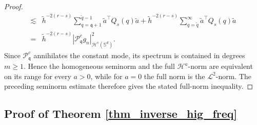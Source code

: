 \documentclass{article}
\numberwithin{equation}{section}
\def\SS{\mathbb{S}}
\def\sul{\sum\limits}
\def\rr{ r}
\def\ss{ s}
\def\pc{\mathcal{P}^c}
\def\mq{\mathfrak{q}}
\begin{document}
\begin{proof}
\begin{equation}
\begin{split}
        \lesssim&\tilde{h}^{-2(\rr-\ss)}\sul_{q=\mq+1}^{\tilde q-1}\tilde{a}^\top Q_\ss(q)\tilde{a}
        +\tilde{h}^{-2(\rr-\ss)}\sul_{q=\tilde q}^{\infty}\tilde{a}^\top Q_\ss(q)\tilde{a}\\
        =&\tilde{h}^{-2(\rr-\ss)}|\pc_\mq g_n|_{\mathcal{H}^s(\SS^d)}^2.
    \end{split}
\end{equation}
Since $\mathcal P_\mq^c$ annihilates the constant mode, its spectrum is contained in degrees $m\geq1$. Hence the homogeneous seminorm and the full $\mathcal H^a$-norm are equivalent on its range for every $a>0$, while for $a=0$ the full norm is the $\mathcal L^2$-norm. The preceding seminorm estimate therefore gives the stated full-norm inequality.
\end{proof}





\subsection{Proof of Theorem \ref{thm_inverse_hig_freq}}
\end{document}
